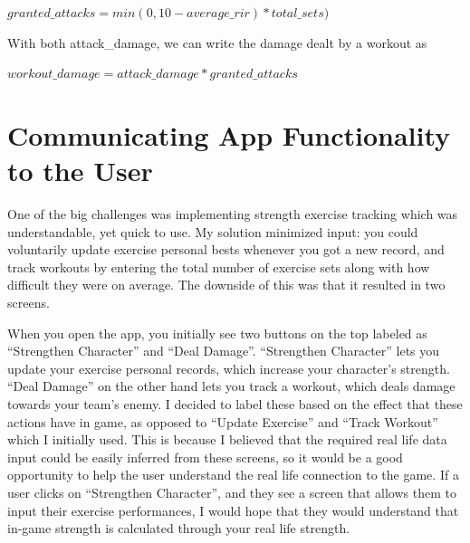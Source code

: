 \documentclass{l4proj}
\begin{document}
\begin{algorithm}
  $granted\_attacks = min(0, 10 - average\_rir) * total\_sets)$
\end{algorithm}

With both attack\_damage, we can write the damage dealt by a workout as 

\begin{algorithm}
  $workout\_damage = attack\_damage * granted\_attacks$ 
\end{algorithm}


\section{Communicating App Functionality to the User}
One of the big challenges was implementing strength exercise tracking which was understandable, yet quick to use. My solution minimized input: you could voluntarily update exercise personal bests whenever you got a new record, and track workouts by entering the total number of exercise sets along with how difficult they were on average. The downside of this was that it resulted in two screens. 

When you open the app, you initially see two buttons on the top labeled as ``Strengthen Character'' and ``Deal Damage''. ``Strengthen Character'' lets you update your exercise personal records, which increase your character's strength. ``Deal Damage'' on the other hand lets you track a workout, which deals damage towards your team's enemy. I decided to label these based on the effect that these actions have in game, as opposed to ``Update Exercise'' and ``Track Workout'' which I initially used. This is because I believed that the required real life data input could be easily inferred from these screens, so it would be a good opportunity to help the user understand the real life connection to the game. If a user clicks on ``Strengthen Character'', and they see a screen that allows them to input their exercise performances, I would hope that they would understand that in-game strength is calculated through your real life strength. 
\end{document}
